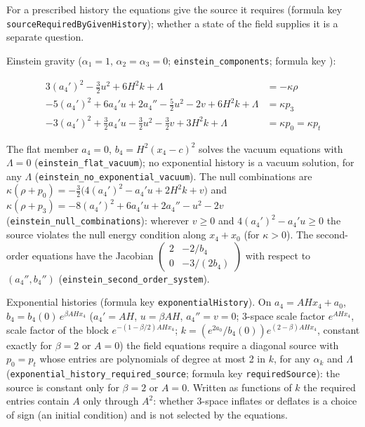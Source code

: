 \documentclass[11pt]{article}
\begin{document}
For a prescribed history the equations give the source it requires (formula key \texttt{sourceRe\allowbreak{}quiredBy\allowbreak{}GivenHis\allowbreak{}tory}); whether a state of the field supplies it is a separate question.

Einstein gravity ($\alpha_1 = 1$, $\alpha_2 = \alpha_3 = 0$; \texttt{einstein\allowbreak{}\_compone\allowbreak{}nts}; formula key \texttt{}):

\[
\begin{aligned}
3 (a_4')^{2} - \tfrac{3}{2} u^{2} + 6 H^{2} k + \Lambda &= -\kappa\rho \\
-5 (a_4')^{2} + 6 a_4' u + 2 a_4'' - \tfrac{5}{2} u^{2} - 2 v + 6 H^{2} k + \Lambda &= \kappa p_3 \\
-3 (a_4')^{2} + \tfrac{3}{2} a_4' u - \tfrac{3}{2} u^{2} - \tfrac{3}{2} v + 3 H^{2} k + \Lambda &= \kappa p_0 = \kappa p_t
\end{aligned}
\]

The flat member $a_4 = 0$, $b_4 = H^2(x_4 - c)^2$ solves the vacuum equations with $\Lambda = 0$ (\texttt{einstein\allowbreak{}\_flat\_va\allowbreak{}cuum}); no exponential history is a vacuum solution, for any $\Lambda$ (\texttt{einstein\allowbreak{}\_no\_expo\allowbreak{}nential\_\allowbreak{}vacuum}). The null combinations are $\kappa(\rho + p_0) = -\tfrac32\big(4(a_4')^2 - a_4'u + 2H^2k + v\big)$ and $\kappa(\rho + p_3) = -8(a_4')^2 + 6a_4'u + 2a_4'' - u^2 - 2v$ (\texttt{einstein\allowbreak{}\_null\_co\allowbreak{}mbinatio\allowbreak{}ns}): wherever $v \geq 0$ and $4(a_4')^2 - a_4'u \geq 0$ the source violates the null energy condition along $x_4 + x_0$ (for $\kappa > 0$). The second-order equations have the Jacobian $\begin{pmatrix}2 & -2/b_4\\ 0 & -3/(2b_4)\end{pmatrix}$ with respect to $(a_4'', b_4'')$ (\texttt{einstein\allowbreak{}\_second\_\allowbreak{}order\_sy\allowbreak{}stem}).

Exponential histories (formula key \texttt{exponent\allowbreak{}ialHisto\allowbreak{}ry}). On $a_4 = AHx_4 + a_0$, $b_4 = b_4(0)\,e^{\beta AHx_4}$ ($a_4' = AH$, $u = \beta AH$, $a_4'' = v = 0$; 3-space scale factor $e^{AHx_4}$, scale factor of the block $e^{-(1 - \beta/2)AHx_4}$; $k = (e^{2a_0}/b_4(0))e^{(2 - \beta)AHx_4}$, constant exactly for $\beta = 2$ or $A = 0$) the field equations require a diagonal source with $p_0 = p_t$ whose entries are polynomials of degree at most 2 in $k$, for any $\alpha_k$ and $\Lambda$ (\texttt{exponent\allowbreak{}ial\_hist\allowbreak{}ory\_requ\allowbreak{}ired\_sou\allowbreak{}rce}; formula key \texttt{required\allowbreak{}Source}): the source is constant only for $\beta = 2$ or $A = 0$. Written as functions of $k$ the required entries contain $A$ only through $A^2$: whether 3-space inflates or deflates is a choice of sign (an initial condition) and is not selected by the equations.
\end{document}
